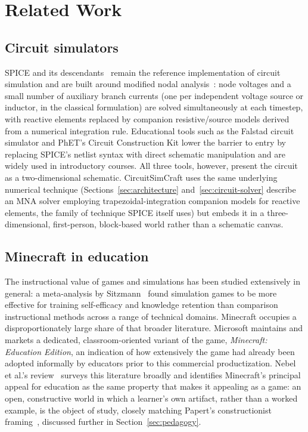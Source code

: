 \section{Related Work}
\label{sec:related-work}

\subsection{Circuit simulators}

SPICE and its descendants~\cite{nagel1973spice} remain the reference implementation of
circuit simulation and are built around modified nodal analysis~\cite{ho1975mna}: node
voltages and a small number of auxiliary branch currents (one per independent voltage source
or inductor, in the classical formulation) are solved simultaneously at each timestep, with
reactive elements replaced by companion resistive/source models derived from a numerical
integration rule. Educational tools such as the Falstad circuit simulator and PhET's Circuit
Construction Kit lower the barrier to entry by replacing SPICE's netlist syntax with direct
schematic manipulation and are widely used in introductory courses. All three tools,
however, present the circuit as a two-dimensional schematic. CircuitSimCraft uses the same
underlying numerical technique (Sections~\ref{sec:architecture}
and~\ref{sec:circuit-solver} describe an MNA solver employing trapezoidal-integration
companion models for reactive elements, the family of technique SPICE itself uses) but
embeds it in a three-dimensional, first-person, block-based world rather than a schematic
canvas.

\subsection{Minecraft in education}
\label{sec:minecraft-in-education}

The instructional value of games and simulations has been studied extensively in general: a
meta-analysis by Sitzmann~\cite{sitzmann2011meta} found simulation games to be more
effective for training self-efficacy and knowledge retention than comparison instructional
methods across a range of technical domains. Minecraft occupies a disproportionately large
share of that broader literature. Microsoft maintains and markets a dedicated,
classroom-oriented variant of the game, \emph{Minecraft: Education Edition}, an indication of
how extensively the game had already been adopted informally by educators prior to this
commercial productization. Nebel et al.'s review~\cite{nebel2016mining} surveys this
literature broadly and identifies Minecraft's principal appeal for education as the same
property that makes it appealing as a game: an open, constructive world in which a learner's
own artifact, rather than a worked example, is the object of study, closely matching
Papert's constructionist framing~\cite{papert1980mindstorms}, discussed further in
Section~\ref{sec:pedagogy}.

